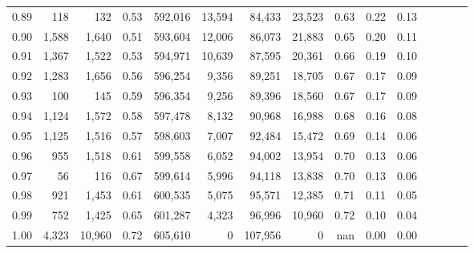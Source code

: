 \begin{tabular}{rrrcrrrrrrrrrrr}
0.89 &     118 &     132 &                                       0.53 &  592,016 &   13,594 &   84,433 &   23,523 &  0.63 &  0.22 &                         0.13 \\
0.90 &   1,588 &   1,640 &                                       0.51 &  593,604 &   12,006 &   86,073 &   21,883 &  0.65 &  0.20 &                         0.11 \\
0.91 &   1,367 &   1,522 &                                       0.53 &  594,971 &   10,639 &   87,595 &   20,361 &  0.66 &  0.19 &                         0.10 \\
0.92 &   1,283 &   1,656 &                                       0.56 &  596,254 &    9,356 &   89,251 &   18,705 &  0.67 &  0.17 &                         0.09 \\
0.93 &     100 &     145 &                                       0.59 &  596,354 &    9,256 &   89,396 &   18,560 &  0.67 &  0.17 &                         0.09 \\
0.94 &   1,124 &   1,572 &                                       0.58 &  597,478 &    8,132 &   90,968 &   16,988 &  0.68 &  0.16 &                         0.08 \\
0.95 &   1,125 &   1,516 &                                       0.57 &  598,603 &    7,007 &   92,484 &   15,472 &  0.69 &  0.14 &                         0.06 \\
0.96 &     955 &   1,518 &                                       0.61 &  599,558 &    6,052 &   94,002 &   13,954 &  0.70 &  0.13 &                         0.06 \\
0.97 &      56 &     116 &                                       0.67 &  599,614 &    5,996 &   94,118 &   13,838 &  0.70 &  0.13 &                         0.06 \\
0.98 &     921 &   1,453 &                                       0.61 &  600,535 &    5,075 &   95,571 &   12,385 &  0.71 &  0.11 &                         0.05 \\
0.99 &     752 &   1,425 &                                       0.65 &  601,287 &    4,323 &   96,996 &   10,960 &  0.72 &  0.10 &                         0.04 \\
1.00 &   4,323 &  10,960 &                                       0.72 &  605,610 &        0 &  107,956 &        0 &   nan &  0.00 &                         0.00 \\
\bottomrule
\end{tabular}
